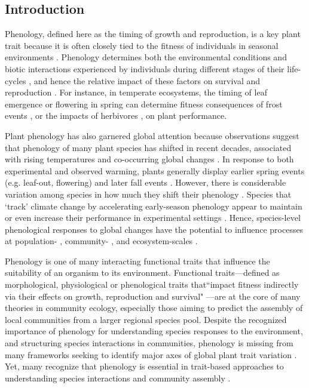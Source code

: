 \documentclass[11pt]{article}
\begin{document}
\subsection*{Introduction} 

Phenology, defined here as the timing of growth and reproduction, is a key plant trait because it is often closely tied to the fitness of individuals in seasonal environments \citep{verdu2005early,munguia2011meta}. Phenology determines both the environmental conditions and biotic interactions experienced by individuals during different stages of their life-cycles \citep{donohue2005niche}, and hence the relative impact of these factors on survival and reproduction \citep{caruso2019meta}. For instance, in temperate ecosystems, the timing of leaf emergence or flowering in spring can determine fitness consequences of frost events \citep{inouye2008effects,augspurger2013reconstructing}, or the impacts of herbivores \citep{meineke2021phenological}, on plant performance.

Plant phenology has also garnered global attention because observations suggest that phenology of many plant species has shifted in recent decades, associated with rising temperatures and co-occurring global changes \citep{wolkovich2012warming,parmesan2015plants,menzel2020climate}. In response to both experimental and observed warming, plants generally display earlier spring events (e.g. leaf-out, flowering) and later fall events \citep[e.g. senescence,][]{Henry:1997lg,menzel2020climate}. However, there is considerable variation among species in how much they shift their phenology \citep[][sometimes termed `phenological sensitivity']{cook2012divergent,wolkovich2012warming,konig2018advances}. Species that `track' climate change by accelerating early-season phenology appear to maintain or even increase their performance in experimental settings \citep{cleland2012phenological,wolkovich2021phenological}. Hence, species-level phenological responses to global changes have the potential to influence processes at population- \citep{iler2021demographic}, community- \citep{cook2012divergent,caradonna2014shifts}, and ecosystem-scales \citep{piao2019plant}.

Phenology is one of many interacting functional traits that influence the suitability of an organism to its environment. Functional traits---defined as morphological, physiological or phenological traits that``impact fitness indirectly via their effects on growth, reproduction and survival" \citep{violle2007let}---are at the core of many theories in community ecology, especially those aiming to predict the assembly of local communities from a larger regional species pool. Despite the recognized importance of phenology for understanding species responses to the environment, and structuring species interactions in communities, phenology is missing from many frameworks seeking to identify major axes of global plant trait variation \citep[e.g.][]{westoby1998leaf,wright2004worldwide,diaz2016global,joswig2022climatic}. Yet, many recognize that phenology is essential in trait-based approaches to understanding species interactions and community assembly \citep{cope2022role}.
\end{document}
